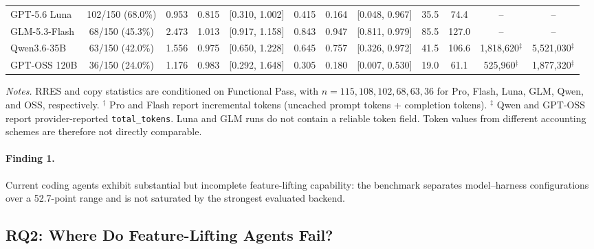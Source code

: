 \documentclass[acmsmall,screen,review,anonymous]{acmart}
\begin{document}
\begin{table}[t]
{\begin{tabular}{l
                  c
                  ccc
                  ccc
                  cc
                  cc}
    GPT-5.6 Luna
    & 102/150 (68.0\%)
    & 0.953
    & 0.815
    & [0.310, 1.002]
    & 0.415
    & 0.164
    & [0.048, 0.967]
    & 35.5
    & 74.4
    & -- 
    & -- \\

    GLM-5.3-Flash
    & 68/150 (45.3\%)
    & 2.473
    & 1.013
    & [0.917, 1.158]
    & 0.843
    & 0.947
    & [0.811, 0.979]
    & 85.5
    & 127.0
    & --
    & -- \\

    Qwen3.6-35B
    & 63/150 (42.0\%)
    & 1.556
    & 0.975
    & [0.650, 1.228]
    & 0.645
    & 0.757
    & [0.326, 0.972]
    & 41.5
    & 106.6
    & 1,818,620$^{\ddagger}$
    & 5,521,030$^{\ddagger}$ \\

    GPT-OSS 120B
    & 36/150 (24.0\%)
    & 1.176
    & 0.983
    & [0.292, 1.648]
    & 0.305
    & 0.180
    & [0.007, 0.530]
    & 19.0
    & 61.1
    & 525,960$^{\ddagger}$
    & 1,877,320$^{\ddagger}$ \\

    \bottomrule
  \end{tabular}
  }

  \vspace{2pt}
  \begin{minipage}{0.99\textwidth}
    \footnotesize
    \textit{Notes.}
    RRES and copy statistics are conditioned on Functional Pass, with
    $n=115,108,102,68,63,36$ for Pro, Flash, Luna, GLM, Qwen, and OSS,
    respectively.
    $^{\dagger}$ Pro and Flash report incremental tokens
    (uncached prompt tokens + completion tokens).
    $^{\ddagger}$ Qwen and GPT-OSS report provider-reported
    \texttt{total\_tokens}.
    Luna and GLM runs do not contain a reliable token field.
    Token values from different accounting schemes are therefore not
    directly comparable.
  \end{minipage}
\end{table}

\paragraph{Finding 1.}
Current coding agents exhibit substantial but incomplete feature-lifting capability:
the benchmark separates model--harness configurations over a 52.7-point range and
is not saturated by the strongest evaluated backend.

\subsection{RQ2: Where Do Feature-Lifting Agents Fail?}
\label{sec:rq2}
\end{document}
